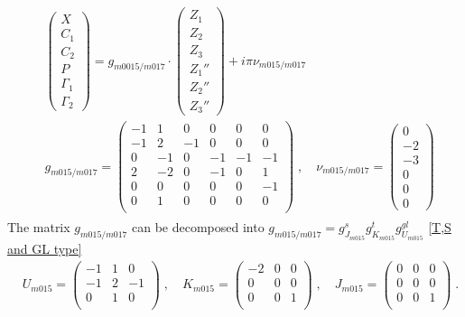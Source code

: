 \documentclass[a4paper,11pt]{article}
\begin{document}
\begin{align}
\begin{split}
&\left(\begin{array}{c} X \\ C_1 \\ C_2 \\ P \\ \Gamma_1 \\ \Gamma_2\end{array}\right) = g_{m0015/m017} \cdot  \left(\begin{array}{c} Z_1 \\ Z_2 \\ Z_3 \\  Z_1'' \\ Z_2'' \\ Z_3''\end{array}\right) +  i \pi \nu_{m015/m017}
\\
&g_{m015/m017}= \left(
\begin{array}{cccccc}
 -1 & 1 & 0 & 0 & 0 & 0 \\
 -1 & 2 & -1 & 0 & 0 & 0 \\
 0 & -1 & 0 & -1 & -1 & -1 \\
 2 & -2 & 0 & -1 & 0 & 1 \\
 0 & 0 & 0 & 0 & 0 & -1 \\
 0 & 1 & 0 & 0 & 0 & 0 \\
\end{array}
\right)\;, \quad \nu_{m015/m017}= \left(\begin{array}{c} 0 \\ -2 \\ -3 \\  0 \\ 0 \\ 0\end{array}\right) 
\end{split}
\end{align}
% 
The matrix $g_{m015/m017}$ can be decomposed into $g_{m015/m017} = g^s_{J_{m015}} g^t_{K_{m015}} g^{gl}_{U_{m015}}$ \eqref{T,S and GL type}
%
\begin{align}
&U_{m015}  = \left(
\begin{array}{ccc}
 -1 & 1 & 0   \\
 -1 & 2 & -1   \\
 0 & 1 & 0   \\
\end{array}
\right)\;, \quad 
K_{m015}  = \left(
\begin{array}{ccc}
 -2 & 0 & 0   \\
 0 & 0 & 0   \\
 0 & 0 & 1   \\
\end{array}
\right)\;, \quad 
J_{m015} = \left(
\begin{array}{ccc}
 0 & 0 & 0   \\
 0 & 0 & 0   \\
 0 & 0 & 1   \\
\end{array}
\right)\;.
\end{align}
\end{document}
